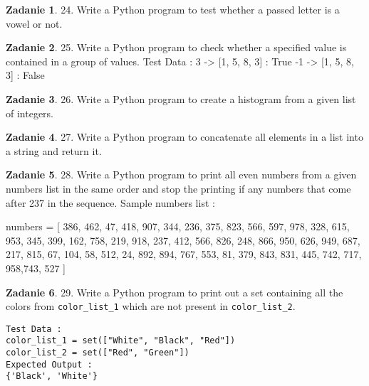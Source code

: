 \documentclass[11pt]{article}
\theoremstyle{definition}
\newtheorem{zadanie}{Zadanie}
\begin{document}
\begin{zadanie}


24. Write a Python program to test whether a passed letter is a vowel or not. 

\end{zadanie}

\begin{zadanie}


25. Write a Python program to check whether a specified value is contained in a group of values. 
Test Data :
3 -> [1, 5, 8, 3] : True
-1 -> [1, 5, 8, 3] : False


\end{zadanie}

\begin{zadanie}


26. Write a Python program to create a histogram from a given list of integers. 

\end{zadanie}

\begin{zadanie}


27. Write a Python program to concatenate all elements in a list into a string and return it. 

\end{zadanie}

\begin{zadanie}


28. Write a Python program to print all even numbers from a given numbers list in the same order and stop the printing if any numbers that come after 237 in the sequence. 
Sample numbers list :

numbers = [    
    386, 462, 47, 418, 907, 344, 236, 375, 823, 566, 597, 978, 328, 615, 953, 345, 
    399, 162, 758, 219, 918, 237, 412, 566, 826, 248, 866, 950, 626, 949, 687, 217, 
    815, 67, 104, 58, 512, 24, 892, 894, 767, 553, 81, 379, 843, 831, 445, 742, 717, 
    958,743, 527
    ]


\end{zadanie}

\begin{zadanie}


29. Write a Python program to print out a set containing all the colors from \texttt{color\_list\_1} which are not present in \texttt{color\_list\_2}.
\begin{verbatim}
Test Data :
color_list_1 = set(["White", "Black", "Red"])
color_list_2 = set(["Red", "Green"])
Expected Output :
{'Black', 'White'}
\end{verbatim}

\end{zadanie}
\end{document}

